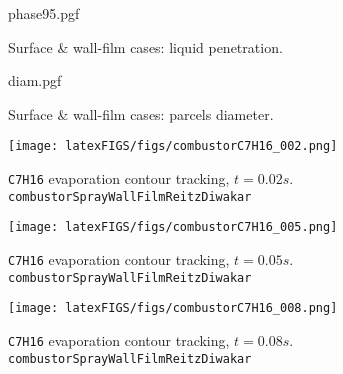     \begin{figure}[!ht]
        \centering
        {phase95.pgf}
        \caption{Surface \& wall-film cases: liquid penetration.}
    \end{figure}

    \begin{figure}[!ht]
        \centering
        {diam.pgf}
        \caption{Surface \& wall-film cases: parcels diameter.}
    \end{figure}

    \begin{figure}[!ht]
        \centering
        \texttt{[image: latexFIGS/figs/combustorC7H16\_002.png]}
        \cprotect\caption[\verb|C7H16| evaporation contour tracking, $t = 0.02s$.]{\verb|C7H16| evaporation contour tracking, $t = 0.02s$. \\ \verb|combustorSprayWallFilmReitzDiwakar|}
    \end{figure}
    
    \begin{figure}[!h]
        \centering
        \texttt{[image: latexFIGS/figs/combustorC7H16\_005.png]}
        \cprotect\caption[\verb|C7H16| evaporation contour tracking, $t = 0.05s$.]{\verb|C7H16| evaporation contour tracking, $t = 0.05s$. \\ \verb|combustorSprayWallFilmReitzDiwakar|}
    \end{figure}
    
    \begin{figure}[!hb]
        \centering
        \texttt{[image: latexFIGS/figs/combustorC7H16\_008.png]}
        \cprotect\caption[\verb|C7H16| evaporation contour tracking, $t = 0.08s$.]{\verb|C7H16| evaporation contour tracking, $t = 0.08s$. \\ \verb|combustorSprayWallFilmReitzDiwakar|}
    \end{figure}

    \clearpage

